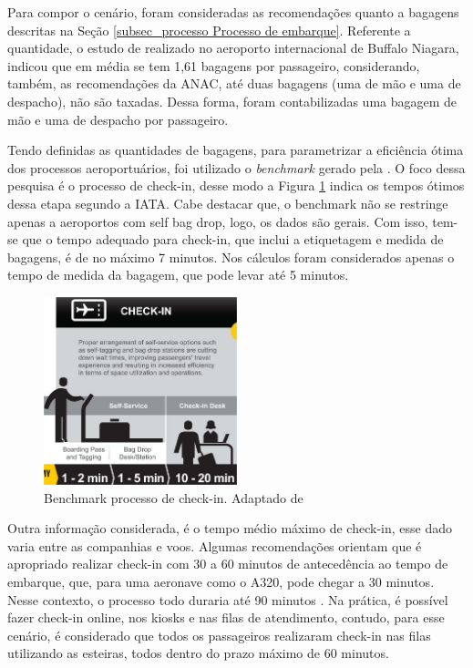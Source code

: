     Para compor o cenário, foram consideradas as recomendações quanto a bagagens descritas na Seção \ref{subsec_processo Processo de embarque}. Referente a quantidade, o estudo de  realizado no aeroporto internacional de Buffalo Niagara, indicou que em média se tem 1,61 bagagens por passageiro, considerando, também, as recomendações da ANAC, até duas bagagens (uma de mão e uma de despacho), não são taxadas. Dessa forma, foram contabilizadas uma bagagem de mão e uma de despacho por passageiro. 

    Tendo definidas as quantidades de bagagens, para parametrizar a eficiência ótima dos processos aeroportuários, foi utilizado o \textit{benchmark} gerado pela . O foco dessa pesquisa é o processo de check-in, desse modo a Figura \ref{fig:tempoDeCheckinSegundoANAC} indica os tempos ótimos dessa etapa segundo a IATA. Cabe destacar que, o benchmark não se restringe apenas a aeroportos com self bag drop, logo, os dados são gerais. Com isso, tem-se que o tempo adequado para check-in, que inclui a etiquetagem e medida de bagagens, é de no máximo 7 minutos. Nos cálculos foram considerados apenas o tempo de medida da bagagem, que pode levar até 5 minutos. 

        \begin{figure}[h!]
           \centering
           \includegraphics[width=0.5\textwidth]{imagens/tempoDeCheckinSegundoANAC.png} 
           \caption{Benchmark processo de check-in. Adaptado de \cite{iata_2022_level}}
           \label{fig:tempoDeCheckinSegundoANAC}
        \end{figure}

    Outra informação considerada, é o tempo médio máximo de check-in, esse dado varia entre as companhias e voos. Algumas recomendações orientam que é apropriado realizar check-in com 30 a 60 minutos de antecedência ao tempo de embarque, que, para uma aeronave como o A320, pode chegar a 30 minutos. Nesse contexto, o processo todo duraria até 90 minutos \cite{universityofminnesota_2022_airport, anac_2016_anac}. Na prática, é possível fazer check-in online, nos kiosks e nas filas de atendimento, contudo, para esse cenário, é considerado que todos os passageiros realizaram check-in nas filas utilizando as esteiras, todos dentro do prazo máximo de 60 minutos. 

